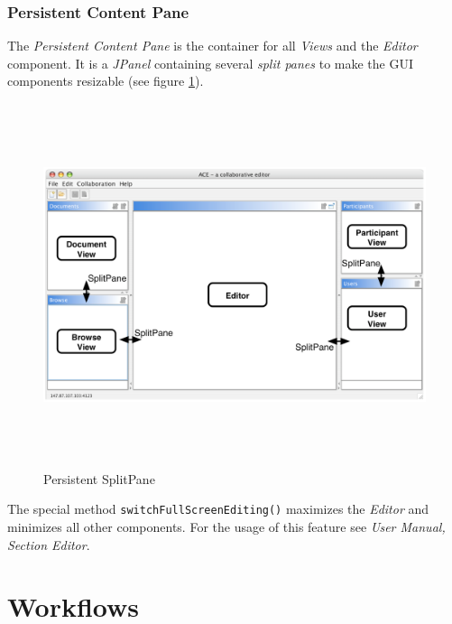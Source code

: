 \subsubsection{Persistent Content Pane}
The \textit{Persistent Content Pane} is the container for all \textit{Views} and the \textit{Editor} component. It is a \textit{JPanel} containing several \textit{split panes} to make the GUI components resizable (see figure \ref{application_splitpane}).

\begin{figure}[H]
\begin{center}
  \includegraphics[height=4.19in, width=6.69in]{../images/finalreport/application_splitpane.eps}
\caption{Persistent SplitPane}
\label{application_splitpane}
\end{center}
\end{figure}

The special method \texttt{switchFullScreenEditing()} maximizes the \textit{Editor} and minimizes all other components. For the usage of this feature see \textit{User Manual, Section Editor}.



\section{Workflows}

